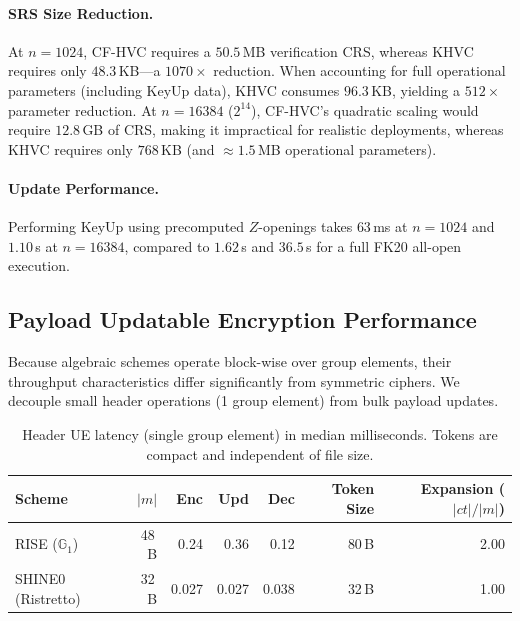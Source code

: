 \paragraph{SRS Size Reduction.}
At $n = 1024$, CF-HVC requires a $50.5$\,MB verification CRS, whereas KHVC requires only $48.3$\,KB—a $1070\times$ reduction. When accounting for full operational parameters (including KeyUp data), KHVC consumes $96.3$\,KB, yielding a $512\times$ parameter reduction. At $n = 16384$ ($2^{14}$), CF-HVC's quadratic scaling would require $12.8$\,GB of CRS, making it impractical for realistic deployments, whereas KHVC requires only $768$\,KB (and $\approx 1.5$\,MB operational parameters).

\paragraph{Update Performance.}
Performing \textsf{KeyUp} using precomputed $Z$-openings takes $63$\,ms at $n = 1024$ and $1.10$\,s at $n = 16384$, compared to $1.62$\,s and $36.5$\,s for a full FK20 all-open execution.

\subsection{Payload Updatable Encryption Performance}
\label{sec:eval_ue}

Because algebraic schemes operate block-wise over group elements, their throughput characteristics differ significantly from symmetric ciphers. We decouple small header operations (1 group element) from bulk payload updates.

\begin{table}[htbp]
\centering
\caption{Header UE latency (single group element) in median milliseconds. Tokens are compact and independent of file size.}
\label{tab:ue_header}
\small
\begin{tabular}{@{}lrrrrrr@{}}
\toprule
Scheme & $|m|$ & Enc & Upd & Dec & Token Size & Expansion ($|ct|/|m|$) \\
\midrule
RISE ($\mathbb{G}_1$)     & 48\,B & 0.24 & 0.36 & 0.12 & 80\,B & 2.00 \\
SHINE0 (Ristretto) & 32\,B & 0.027 & 0.027 & 0.038 & 32\,B & 1.00 \\
\bottomrule
\end{tabular}
\end{table}

